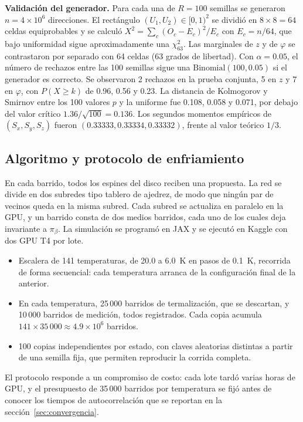 \textbf{Validación del generador.} Para cada una de $R=100$ semillas se generaron $n=4\times10^6$ direcciones. El rectángulo $(U_1,U_2)\in[0,1)^2$ se dividió en $8\times8=64$ celdas equiprobables y se calculó $X^2=\sum_c(O_c-E_c)^2/E_c$ con $E_c=n/64$, que bajo uniformidad sigue aproximadamente una $\chi^2_{63}$. Las marginales de $z$ y de $\varphi$ se contrastaron por separado con 64 celdas (63 grados de libertad). Con $\alpha=0.05$, el número de rechazos entre las 100 semillas sigue una $\mathrm{Binomial}(100,0.05)$ si el generador es correcto. Se observaron 2 rechazos en la prueba conjunta, 5 en $z$ y 7 en $\varphi$, con $P(X\ge k)$ de 0.96, 0.56 y 0.23. La distancia de Kolmogorov y Smirnov entre los 100 valores $p$ y la uniforme fue 0.108, 0.058 y 0.071, por debajo del valor crítico $1.36/\sqrt{100}=0.136$. Los segundos momentos empíricos de $(S_x,S_y,S_z)$ fueron $(0.33333,0.33334,0.33332)$, frente al valor teórico $1/3$.

\subsection{Algoritmo y protocolo de enfriamiento}

En cada barrido, todos los espines del disco reciben una propuesta. La red se divide en dos subredes tipo tablero de ajedrez, de modo que ningún par de vecinos queda en la misma subred. Cada subred se actualiza en paralelo en la GPU, y un barrido consta de dos medios barridos, cada uno de los cuales deja invariante a $\pi_\beta$. La simulación se programó en JAX y se ejecutó en Kaggle con dos GPU T4 por lote.

\begin{itemize}
\item Escalera de 141 temperaturas, de 20.0 a 6.0~K en pasos de 0.1~K, recorrida de forma secuencial: cada temperatura arranca de la configuración final de la anterior.
\item En cada temperatura, 25\,000 barridos de termalización, que se descartan, y 10\,000 barridos de medición, todos registrados. Cada copia acumula $141\times35\,000\approx4.9\times10^6$ barridos.
\item 100 copias independientes por estado, con claves aleatorias distintas a partir de una semilla fija, que permiten reproducir la corrida completa.
\end{itemize}

El protocolo responde a un compromiso de costo: cada lote tardó varias horas de GPU, y el presupuesto de 35\,000 barridos por temperatura se fijó antes de conocer los tiempos de autocorrelación que se reportan en la sección~\ref{sec:convergencia}.
